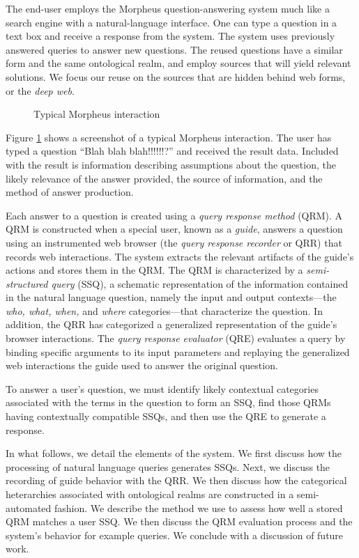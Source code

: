 
The end-user employs the Morpheus question-answering system much like a search engine with a natural-language interface. One can type a question in a text box and receive a response from the system. The system uses previously answered queries to answer new questions.  The reused questions have a similar form and the same ontological realm, and employ sources that will yield relevant solutions.  We focus our reuse on the sources that are hidden behind web forms, or the \emph{deep web}.

\begin{figure}
\caption{Typical Morpheus interaction}
\label{fig:screenshot}
\end{figure}

Figure \ref{fig:screenshot} shows a screenshot of a typical Morpheus
interaction. The user has typed a question ``Blah blah blah!!!!!!?'' and
received the result data.  Included with the result is information describing assumptions about the question, the likely relevance of the answer provided,
the source of information, and the method of answer production.

Each answer to a question is created using a \emph{query response
  method} (QRM). A QRM is constructed when a special user, known as a
\emph{guide}, answers a question using an instrumented web browser (the
\emph{query response recorder} or QRR) that records web
interactions. The system extracts the relevant artifacts of the
guide's actions and stores them in the QRM. The QRM is characterized
by a \emph{semi-structured query} (SSQ), a schematic representation of
the information contained in the natural language question, namely the input and output
contexts---the \emph{who, what, when,} and \emph{where}
categories---that characterize the question.  In addition, the QRR has categorized a generalized representation of the guide's browser
interactions.  The \emph{query response evaluator} (QRE) evaluates a
query by binding specific arguments to its input parameters and
replaying the generalized web interactions the guide used to answer
the original question.

To answer a user's question, we must identify likely contextual
categories associated with the terms in the question to form an SSQ,
find those QRMs having contextually compatible SSQs, and then use the QRE to
generate a response.


In what follows, we detail the elements of the system.  We first
discuss how the processing of natural language queries generates SSQs.
Next, we discuss the recording of guide behavior with the QRR.  We
then discuss how the categorical heterarchies associated with
ontological realms are constructed in a semi-automated fashion.  We
describe the method we use to assess how well a stored QRM matches a
user SSQ.  We then discuss the QRM evaluation process and the
system's behavior for example queries. We conclude with a discussion of
future work.
 
